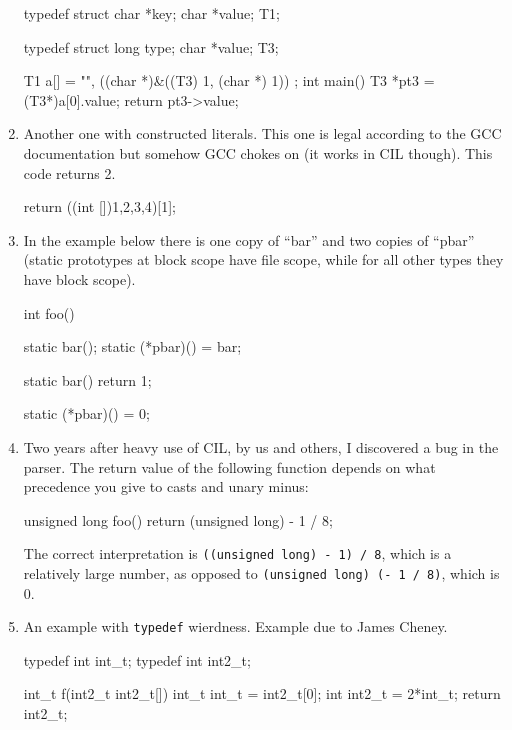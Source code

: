 \documentclass[letterpaper]{article}
\def\t#1{{\tt #1}}
\begin{document}
\begin{enumerate}
\begin{cilcode}[global]
typedef struct
{
  char *key;
  char *value;
} T1;

typedef struct
{
  long type;
  char *value;
} T3;

T1 a[] =
{
  {
    "",
    ((char *)&((T3) {1, (char *) 1}))
  }
};
int main() {
   T3 *pt3 = (T3*)a[0].value;
   return pt3->value;
}
\end{cilcode}

\item Another one with constructed literals. This one is legal according to
the GCC documentation but somehow GCC chokes on (it works in CIL though). This
code returns 2.

\begin{cilcode}[local]
 return ((int []){1,2,3,4})[1];
\end{cilcode}

\item In the example below there is one copy of ``bar'' and two copies of
  ``pbar'' (static prototypes at block scope have file scope, while for all
  other types they have block scope).  

\begin{cilcode}[global]
  int foo() {
     static bar();
     static (*pbar)() = bar;

  }

  static bar() { 
    return 1;
  }

  static (*pbar)() = 0;
\end{cilcode}


\item Two years after heavy use of CIL, by us and others, I discovered a bug
  in the parser. The return value of the following function depends on what
  precedence you give to casts and unary minus:
\begin{cilcode}[global]
  unsigned long foo() {
    return (unsigned long) - 1 / 8;
  }
\end{cilcode}

  The correct interpretation is \t{((unsigned long) - 1) / 8}, which is a
  relatively large number, as opposed to \t{(unsigned long) (- 1 / 8)}, which
  is 0. 

\item An example with \t{typedef} wierdness. Example due to James Cheney. 
\begin{cilcode}[global]
typedef int int_t;
typedef int int2_t;

int_t f(int2_t int2_t[]) {
  int_t int_t = int2_t[0];
  {
    int int2_t = 2*int_t;
    return int2_t;
  }
}
\end{cilcode}

\end{enumerate}
\end{document}
